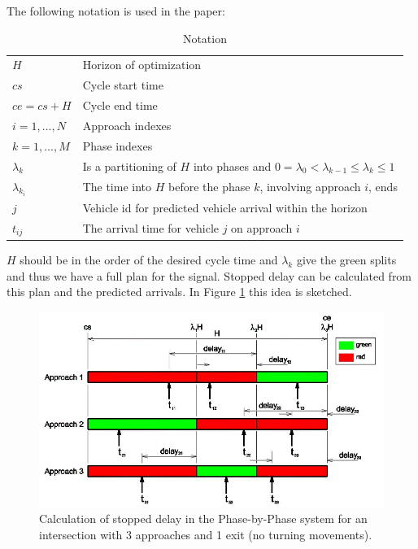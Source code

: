 The following notation is used in the paper:

\begin{table}[!ht]
\begin{center}
\begin{tabular}{ll}
\hline
$H$ & Horizon of optimization \\
$cs$ & Cycle start time \\
$ce = cs+H$ & Cycle end time \\
$i = 1,...,N$ & Approach indexes \\
$k = 1,...,M$ & Phase indexes \\
$\lambda_k$ &  Is a partitioning of $H$ into phases and $0 = \lambda_{0} <  \lambda_{k-1} \leq \lambda_k \leq 1$ \\
$\lambda_{k_i}$ & The time into $H$ before the phase $k$, involving approach $i$, ends \\
$j$ & Vehicle id for predicted vehicle arrival within the horizon  \\
$t_{ij}$ & The arrival time for vehicle $j$ on approach $i$
\\ \hline
\end{tabular}
\end{center}
\caption{Notation}
\end{table}

$H$ should be in the order of the desired cycle time and $\lambda_k$ give the green splits and thus we have a full plan for the signal. Stopped delay can be calculated from this plan and the predicted arrivals. In Figure \ref{fig:pp_delay} this idea is sketched.

\begin{figure}[!ht]
\begin{center}
\includegraphics[scale=0.5]{phase-by-phase_delay-model.png} 
\end{center}
\caption{Calculation of stopped delay in the Phase-by-Phase system for an intersection with 3 approaches and 1 exit (no turning movements).}
\label{fig:pp_delay}
\end{figure}

